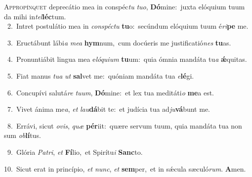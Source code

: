 \lettrine{\initial\textcolor{\initialcolor}{A}}{ppropínquet} deprecátio mea in conspéc\textit{tu} \textit{tu}\-\textit{o}, \textbf{Dó}\-mine:~\star juxta elóquium tuum da mihi in\-\textit{tel}\-\textbf{léc}tum.\\
{\numbfont\textcolor{\numbcolor}{~2.}}~Intret postulátio mea in \textit{con}\-\textit{spéc}\textit{tu} \textbf{tu}\-o:~\star secúndum elóquium tuum é\-\textit{ri}\-\textbf{pe} me.\par
{\numbfont\textcolor{\numbcolor}{~3.}}~Eructábunt lábi\textit{a} \textit{me}\-\textit{a} \textbf{hym}\-num,~\star cum docúeris me justificatió\textit{nes} \textbf{tu}\-as.\par
{\numbfont\textcolor{\numbcolor}{~4.}}~Pronuntiábit lingua mea e\-\textit{ló}\-\textit{qui}\textit{um} \textbf{tu}\-um:~\star quia ómnia mandáta tu\textit{a} \textbf{ǽ}\-quitas.\par
{\numbfont\textcolor{\numbcolor}{~5.}}~Fiat manus \textit{tu}\-\textit{a} \textit{ut} \textbf{sal}\-vet me:~\star quóniam mandáta tua \textit{e}\-\textbf{lé}gi.\par
{\numbfont\textcolor{\numbcolor}{~6.}}~Concupívi salutá\textit{re} \textit{tu}\-\textit{um}, \textbf{Dó}\-mine:~\star et lex tua meditáti\textit{o} \textbf{me}\-a est.\par
{\numbfont\textcolor{\numbcolor}{~7.}}~Vivet ánima me\-\textit{a}\-, \textit{et} \textit{lau}\-\textbf{dá}bit te:~\star et judícia tua ad\-\textit{ju}\-\textbf{vá}bunt me.\par
{\numbfont\textcolor{\numbcolor}{~8.}}~Errávi, sicut \textit{o}\-\textit{vis}, \textit{quæ} \textbf{pér}\-iit:~\star quære servum tuum, quia mandáta tua non sum \textit{ob}\-\textbf{lí}tus.\par
{\numbfont\textcolor{\numbcolor}{~9.}}~Glória \textit{Pa}\-\textit{tri}, \textit{et} \textbf{Fí}\-lio,~\star et Spirítu\textit{i} \textbf{Sanc}\-to.\par
{\numbfont\textcolor{\numbcolor}{10.}}~Sicut erat in princípio, \textit{et} \textit{nunc}\-, \textit{et} \textbf{sem}\-per,~\star et in sǽcula sæculó\-\textit{rum}\-. \textbf{A}\-men.\par
